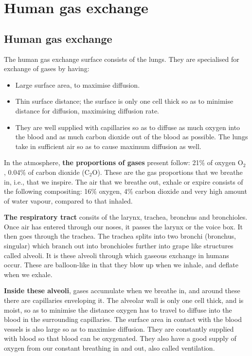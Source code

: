 \section{Human gas exchange}
\subsection{Human gas exchange}
The human gas exchange surface consists of the lungs. They are specialised for exchange of gases
by having:
\begin{itemize}
	\item Large surface area, to maximise diffusion.
	\item Thin surface distance; the surface is only one cell thick so as to minimise distance for
		diffusion, maximising diffusion rate.
	\item They are well supplied with capillaries so as to diffuse as much oxygen into the blood
		and as much carbon dioxide out of the blood as possible. The lungs take in sufficient air
		so as to cause maximum diffusion as well.
\end{itemize}
In the atmosphere, \textbf{the proportions of gases} present follow: 21\% of oxygen $\textrm{O}_2$
, 0.04\% 
of carbon dioxide ($\textrm{C}_2\textrm{O}$). These are the gas proportions that we breathe in,
i.e., that we inspire. The air that we breathe out, exhale or expire consists of the following
compositing: 16\% oxygen, 4\% carbon dioxide and very high amount of water vapour, compared to that
inhaled.

\textbf{The respiratory tract} consits of the larynx, trachea, bronchus and bronchioles.
Once air has entered through our noses, it passes the larynx or the voice box. It then goes through
the trachea. The trachea splits into two bronchi (bronchus, singular) which branch out into 
bronchioles further into
grape like structures called alveoli. It is these alveoli through which gaseous exchange in humans
occur. These are balloon-like in that they blow up when we inhale, and deflate when we exhale.

\textbf{Inside these alveoli}, gases accumulate when we breathe in, and around these there are 
capillaries
enveloping it. The alveolar wall is only one cell thick, and is moist, so as to minimise the 
distance oxygen has to travel to diffuse into the blood in the surrounding capillaries. The surface
area in contact with the blood vessels is also large so as to maximise diffusion. They are 
constantly supplied with blood so that blood can be oxygenated. They also have a good supply of 
oxygen from our constant breathing in and out, also called ventilation.

